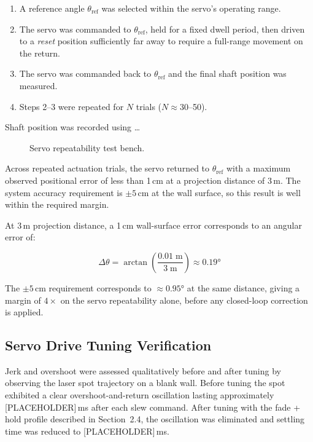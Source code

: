 \documentclass[12pt]{article}
\begin{document}
\begin{enumerate}
  \item A reference angle $\theta_{\text{ref}}$ was selected within the servo's
        operating range.
  \item The servo was commanded to $\theta_{\text{ref}}$, held for a fixed dwell
        period, then driven to a \emph{reset} position sufficiently far away to
        require a full-range movement on the return.
  \item The servo was commanded back to $\theta_{\text{ref}}$ and the final
        shaft position was measured.
  \item Steps 2--3 were repeated for $N$ trials ($N \approx 30$--50).
\end{enumerate}

Shaft position was recorded using \ldots

\begin{figure}[H]
  \centering
  \caption{Servo repeatability test bench.}
  \label{fig:servo_bench}
\end{figure}

Across repeated actuation trials, the servo returned to $\theta_{\text{ref}}$
with a maximum observed positional error of less than 1\,cm at a projection
distance of 3\,m.  The system accuracy requirement is $\pm 5$\,cm at the wall
surface, so this result is well within the required margin.

At 3\,m projection distance, a 1\,cm wall-surface error corresponds to an
angular error of:

\begin{equation}
  \Delta\theta = \arctan\!\left(\frac{0.01\;\text{m}}{3\;\text{m}}\right)
               \approx 0.19°
  \label{eq:angle_budget}
\end{equation}

The $\pm 5$\,cm requirement corresponds to $\approx 0.95°$ at the same distance,
giving a margin of $4\times$ on the servo repeatability alone, before any
closed-loop correction is applied.

\subsection{Servo Drive Tuning Verification}

Jerk and overshoot were assessed qualitatively before and after tuning by
observing the laser spot trajectory on a blank wall.  Before tuning the spot
exhibited a clear overshoot-and-return oscillation lasting approximately
[PLACEHOLDER]\,ms after each slew command.  After tuning with the fade + hold
profile described in Section~2.4, the oscillation was eliminated and settling
time was reduced to [PLACEHOLDER]\,ms.
\end{document}

